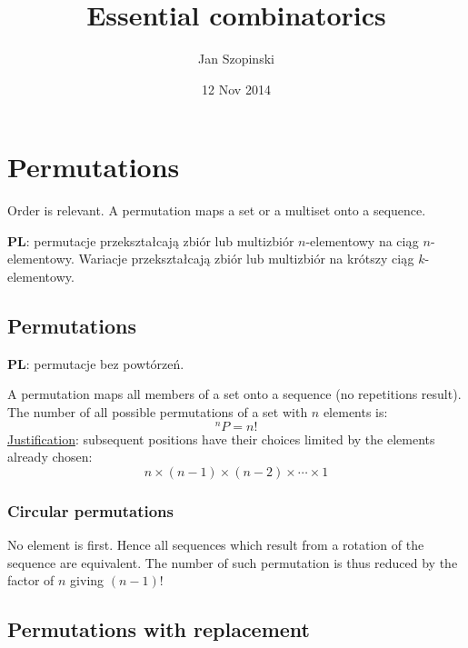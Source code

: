 \documentclass{article}
\begin{document}
\title{Essential combinatorics}
\author{Jan Szopinski}
\date{12 Nov 2014}
\maketitle

\section{Permutations}

Order is relevant. A permutation maps a set or a multiset onto a sequence.

\textbf{PL}: permutacje przekształcają zbiór lub multizbiór $n$\nobreakdash-\hspace{0pt}elementowy na ciąg $n$\nobreakdash-\hspace{0pt}elementowy.
Wariacje przekształcają zbiór lub multizbiór na krótszy ciąg $k$\nobreakdash-\hspace{0pt}elementowy.

\subsection{Permutations}

\textbf{PL}: permutacje bez powtórzeń.

A permutation maps all members of a set onto a sequence (no repetitions result).
The number of all possible permutations of a set with $n$ elements is:
\begin{equation}
  ^nP = n!
\end{equation}
\underline{Justification}: subsequent positions have their choices limited by the elements already chosen:
\begin{equation*}
  n\times(n-1)\times(n-2)\times \dotsb \times 1
\end{equation*}

\subsubsection{Circular permutations}

No element is first.
Hence all sequences which result from a rotation of the sequence are equivalent.
The number of such permutation is thus reduced by the factor of $n$ giving ${(n-1)!}$

\subsection{Permutations with replacement}
\end{document}
